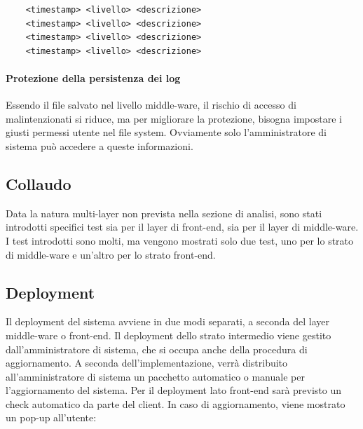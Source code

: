 \documentclass[a4paper]{article}
\begin{document}
\begin{lstlisting}
    <timestamp> <livello> <descrizione>
    <timestamp> <livello> <descrizione>
    <timestamp> <livello> <descrizione>
    <timestamp> <livello> <descrizione>
\end{lstlisting}

\paragraph{Protezione della persistenza dei log} Essendo il file salvato nel livello middle-ware, il rischio di accesso di malintenzionati si riduce, ma per migliorare la protezione, bisogna impostare i giusti permessi utente nel file system. Ovviamente solo l'amministratore di sistema può accedere a queste informazioni.

\newpage

\subsection{Collaudo}

Data la natura multi-layer non prevista nella sezione di analisi, sono stati introdotti specifici test sia per il layer di front-end, sia per il layer di middle-ware. I test introdotti sono molti, ma vengono mostrati solo due test, uno per lo strato di middle-ware e un'altro per lo strato front-end.




\newpage

\subsection{Deployment}

Il deployment del sistema avviene in due modi separati, a seconda del layer middle-ware o front-end. Il deployment dello strato intermedio viene gestito dall'amministratore di sistema, che si occupa anche della procedura di aggiornamento. A seconda dell'implementazione, verrà distribuito all'amministratore di sistema un pacchetto automatico o manuale per l'aggiornamento del sistema. Per il deployment lato front-end sarà previsto un check automatico da parte del client. In caso di aggiornamento, viene mostrato un pop-up all'utente:
\end{document}
